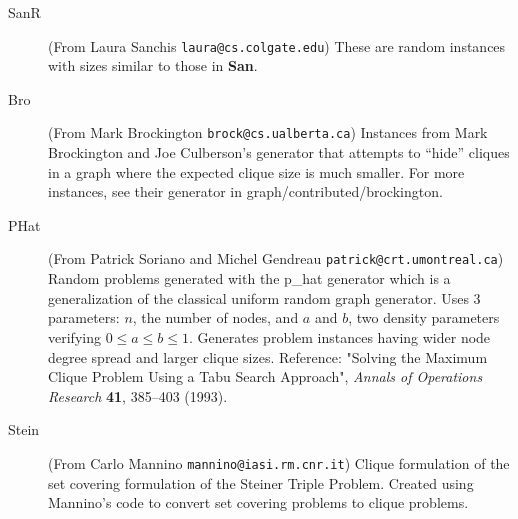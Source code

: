 \begin{description}
\item[SanR] (From Laura Sanchis {\tt laura@cs.colgate.edu}) These
are random instances with sizes similar to those in {\bf San}.

\item[Bro] (From Mark Brockington {\tt brock@cs.ualberta.ca})
Instances from Mark Brockington and Joe Culberson's generator that
attempts to ``hide'' cliques in a graph where the expected clique size
is much smaller.  For more instances, see their generator in
graph/contributed/brockington.  

\item [PHat] (From Patrick Soriano and Michel Gendreau 
               {\tt  patrick@crt.umontreal.ca})
     Random problems generated with the p\_hat generator which is a 
     generalization of the classical uniform random graph generator. Uses
     3 parameters: $n$, the number of nodes, and $a$ and $b$, two density 
     parameters verifying $0 \le a \le b \le 1$. Generates problem instances 
     having wider node degree spread and larger clique sizes. Reference: 
     "Solving the Maximum Clique Problem Using a Tabu Search Approach", 
     {\em Annals of Operations Research} {\bf 41}, 385--403 (1993).

\item[Stein] (From Carlo Mannino {\tt mannino@iasi.rm.cnr.it}) Clique
formulation of the set covering formulation of the Steiner Triple
Problem.  Created using Mannino's code to convert set covering
problems to clique problems.

\end{description}

